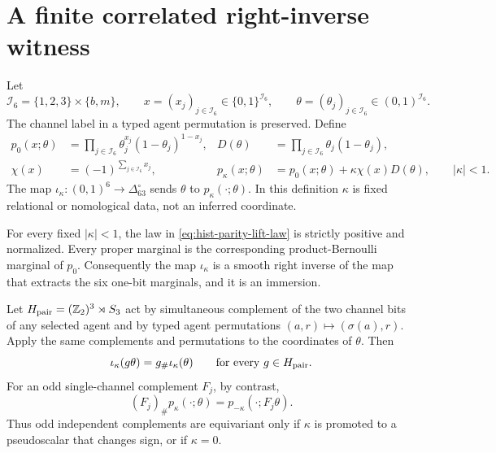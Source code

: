 \section{A finite correlated right-inverse witness}
\label{sec:hist-finite-parity-lift}

Let
\begin{equation}
\mathcal I_6=\{1,2,3\}\times\{b,m\},
\qquad
x=(x_j)_{j\in\mathcal I_6}\in\{0,1\}^{\mathcal I_6},
\qquad
\theta=(\theta_j)_{j\in\mathcal I_6}\in(0,1)^{\mathcal I_6}.
\label{eq:hist-parity-indexing}
\end{equation}
The channel label in a typed agent permutation is preserved.  Define
\begin{align}
p_0(x;\theta)
&=\prod_{j\in\mathcal I_6}\theta_j^{x_j}(1-\theta_j)^{1-x_j},
&
D(\theta)
&=\prod_{j\in\mathcal I_6}\theta_j(1-\theta_j),
\label{eq:hist-parity-product-and-amplitude}\\
\chi(x)
&=(-1)^{\sum_{j\in\mathcal I_6}x_j},
&
p_\kappa(x;\theta)
&=p_0(x;\theta)+\kappa\chi(x)D(\theta),
\qquad |\kappa|<1.
\label{eq:hist-parity-lift-law}
\end{align}
The map \(\iota_\kappa:(0,1)^6\to\Delta^\circ_{63}\) sends \(\theta\)
to \(p_\kappa(\mathord{\cdot};\theta)\).  In this definition \(\kappa\)
is fixed relational or nomological data, not an inferred coordinate.

For every fixed \(|\kappa|<1\), the law in
\eqref{eq:hist-parity-lift-law} is strictly positive and normalized.  Every
proper marginal is the corresponding product-Bernoulli marginal of \(p_0\).
Consequently the map \(\iota_\kappa\) is a smooth right inverse of the map
that extracts the six one-bit marginals, and it is an immersion.

Let \(H_{\rm pair}=(\mathbb Z_2)^3\rtimes S_3\) act by simultaneous
complement of the two channel bits of any selected agent and by typed agent
permutations \((a,r)\mapsto(\sigma(a),r)\).  Apply the same complements and
permutations to the coordinates of \(\theta\).  Then
\begin{equation}
\iota_\kappa(g\theta)=g_\#\iota_\kappa(\theta)
\qquad\text{for every }g\in H_{\rm pair}.
\label{eq:hist-parity-paired-equivariance}
\end{equation}
For an odd single-channel complement \(F_j\), by contrast,
\begin{equation}
(F_j)_\#p_\kappa(\mathord{\cdot};\theta)
=p_{-\kappa}(\mathord{\cdot};F_j\theta).
\label{eq:hist-parity-odd-pseudoscalar}
\end{equation}
Thus odd independent complements are equivariant only if \(\kappa\) is
promoted to a pseudoscalar that changes sign, or if \(\kappa=0\).

